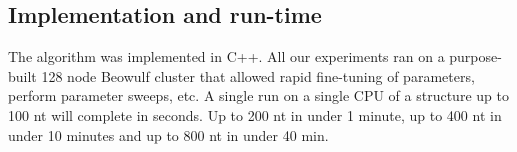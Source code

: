 \documentclass{doublecol-new}
\theoremstyle{TH}{
\newtheorem{lemma}{Lemma}
\newtheorem{theorem}[lemma]{Theorem}
\newtheorem{corrolary}[lemma]{Corrolary}
\newtheorem{conjecture}[lemma]{Conjecture}
\newtheorem{proposition}[lemma]{Proposition}
\newtheorem{claim}[lemma]{Claim}
\newtheorem{stheorem}[lemma]{Wrong Theorem}
\newtheorem{algorithm}{Algorithm}
}
\theoremstyle{THrm}{
\newtheorem{definition}{Definition}
\newtheorem{question}{Question}
\newtheorem{remark}{Remark}
\newtheorem{scheme}{Scheme}
}
\theoremstyle{THhit}{
\newtheorem{case}{Case}[section]
}
\begin{document}
%
%
%

\subsection{Implementation and run-time}
The algorithm was implemented in C++. 
All our experiments ran on a purpose-built 128 node Beowulf cluster that allowed rapid fine-tuning of parameters, perform parameter sweeps, etc. 
A single run on a single CPU of a structure up to 100 nt will complete in seconds. Up to 200 nt in under 1 minute, up to 400 nt in under 10 minutes and up to 800 nt in under 40 min. 
\end{document}
